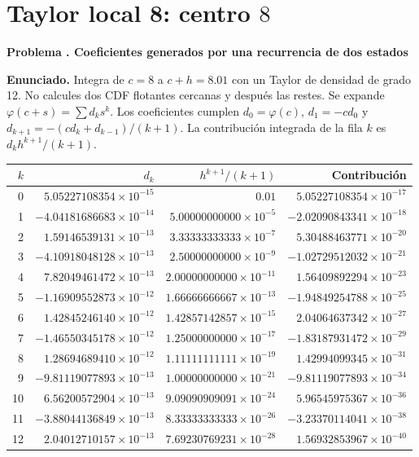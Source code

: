 \documentclass[11pt,a4paper]{article}
\theoremstyle{definition}
\newcounter{problema}
\newenvironment{resuelto}[1]{\refstepcounter{problema}\par\medskip\Needspace{6\baselineskip}\textbf{Problema \theproblema. #1}\par}{\par\medskip}
\begin{document}
\section{\texorpdfstring{Taylor local 8: centro $8$}{Taylor local 8: centro 8}}
\begin{resuelto}{Coeficientes generados por una recurrencia de dos estados}
\textbf{Enunciado.} Integra de $c=8$ a $c+h=8.01$ con un Taylor de densidad de grado 12. No calcules dos CDF flotantes cercanas y después las restes.
Se expande $\varphi(c+s)=\sum d_ks^k$. Los coeficientes cumplen $d_0=\varphi(c)$, $d_1=-cd_0$ y $d_{k+1}=-(cd_k+d_{k-1})/(k+1)$. La contribución integrada de la fila $k$ es $d_kh^{k+1}/(k+1)$.

\begin{center}\small\begin{tabular}{rrrr}
\toprule
$k$&$d_k$&$h^{k+1}/(k+1)$&Contribución\\
\midrule
0&$5.05227108354\times10^{-15}$&$0.01$&$5.05227108354\times10^{-17}$\\
1&$-4.04181686683\times10^{-14}$&$5.00000000000\times10^{-5}$&$-2.02090843341\times10^{-18}$\\
2&$1.59146539131\times10^{-13}$&$3.33333333333\times10^{-7}$&$5.30488463771\times10^{-20}$\\
3&$-4.10918048128\times10^{-13}$&$2.50000000000\times10^{-9}$&$-1.02729512032\times10^{-21}$\\
4&$7.82049461472\times10^{-13}$&$2.00000000000\times10^{-11}$&$1.56409892294\times10^{-23}$\\
5&$-1.16909552873\times10^{-12}$&$1.66666666667\times10^{-13}$&$-1.94849254788\times10^{-25}$\\
6&$1.42845246140\times10^{-12}$&$1.42857142857\times10^{-15}$&$2.04064637342\times10^{-27}$\\
7&$-1.46550345178\times10^{-12}$&$1.25000000000\times10^{-17}$&$-1.83187931472\times10^{-29}$\\
8&$1.28694689410\times10^{-12}$&$1.11111111111\times10^{-19}$&$1.42994099345\times10^{-31}$\\
9&$-9.81119077893\times10^{-13}$&$1.00000000000\times10^{-21}$&$-9.81119077893\times10^{-34}$\\
10&$6.56200572904\times10^{-13}$&$9.09090909091\times10^{-24}$&$5.96545975367\times10^{-36}$\\
11&$-3.88044136849\times10^{-13}$&$8.33333333333\times10^{-26}$&$-3.23370114041\times10^{-38}$\\
12&$2.04012710157\times10^{-13}$&$7.69230769231\times10^{-28}$&$1.56932853967\times10^{-40}$\\

\end{tabular}
\end{center}
\end{resuelto}
\end{document}
